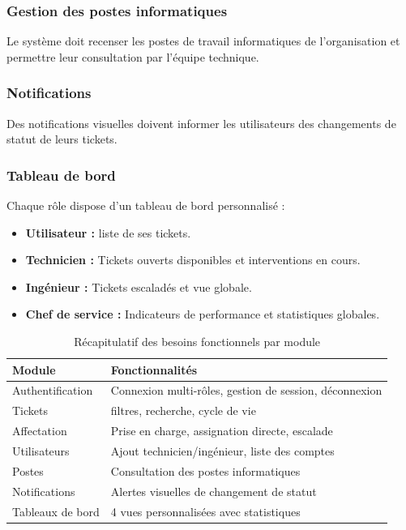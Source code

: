 \documentclass[12pt,a4paper,oneside]{report}
\renewcommand{\arraystretch}{1.3}
\begin{document}
\subsubsection{Gestion des postes informatiques}

Le système doit recenser les postes de travail informatiques de l'organisation et permettre leur consultation par l'équipe technique.

\subsubsection{Notifications}

Des notifications visuelles doivent informer les utilisateurs des changements de statut de leurs tickets.

\subsubsection{Tableau de bord}

Chaque rôle dispose d'un tableau de bord personnalisé :
\begin{itemize}
    \item \textbf{Utilisateur :} liste de ses tickets.
    \item \textbf{Technicien :} Tickets ouverts disponibles et interventions en cours.
    \item \textbf{Ingénieur :} Tickets escaladés et vue globale.
    \item \textbf{Chef de service :} Indicateurs de performance et statistiques globales.
\end{itemize}

\begin{table}[htbp]
    \centering
    \caption{Récapitulatif des besoins fonctionnels par module}
    \label{tab:besoins-fonctionnels}
    \renewcommand{\arraystretch}{1.4}
    \begin{tabular}{p{4cm} p{9cm}}
        \toprule
        \textbf{Module} & \textbf{Fonctionnalités} \\
        \midrule
        Authentification & Connexion multi-rôles, gestion de session, déconnexion \\
        Tickets & filtres, recherche, cycle de vie \\
        Affectation & Prise en charge, assignation directe, escalade \\
        Utilisateurs & Ajout technicien/ingénieur, liste des comptes \\
        Postes & Consultation des postes informatiques \\
        Notifications & Alertes visuelles de changement de statut \\
        Tableaux de bord & 4 vues personnalisées avec statistiques \\
        \bottomrule
    \end{tabular}
\end{table}
\end{document}
